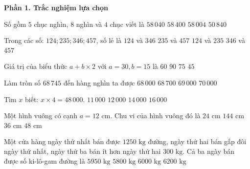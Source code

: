 \textbf{Phần 1. Trắc nghiệm lựa chọn}

\begin{ex} %
Số gồm $5$ chục nghìn, $8$ nghìn và $4$ chục viết là
\choice
{\True $58\,040$}
{$58\,400$}
{$58\,004$}
{$50\,840$}
\end{ex}

\begin{ex} %
Trong các số: $124; 235; 346; 457$, số lẻ là
\choice
{$124$ và $346$}
{\True $235$ và $457$}
{$124$ và $235$}
{$346$ và $457$}
\end{ex}

\begin{ex} %
Giá trị của biểu thức $a + b \times 2$ với $a = 30, b = 15$ là
\choice
{\True $60$}
{$90$}
{$75$}
{$45$}
\end{ex}

\begin{ex} %
Làm tròn số $68\,745$ đến hàng nghìn ta được
\choice
{$68\,000$}
{$68\,700$}
{\True $69\,000$}
{$70\,000$}
\end{ex}

\begin{ex} %
Tìm $x$ biết: $x \times 4 = 48\,000$.
\choice
{$11\,000$}
{\True $12\,000$}
{$14\,000$}
{$16\,000$}
\end{ex}

\begin{ex} %
Một hình vuông có cạnh $a = 12\text{ cm}$. Chu vi của hình vuông đó là
\choice
{$24\text{ cm}$}
{$144\text{ cm}$}
{$36\text{ cm}$}
{\True $48\text{ cm}$}
\end{ex}

\begin{ex} %
Một cửa hàng ngày thứ nhất bán được $1250\text{ kg}$ đường, ngày thứ hai bán gấp đôi ngày thứ nhất, ngày thứ ba bán ít hơn ngày thứ hai $300\text{ kg}$. Cả ba ngày bán được số ki-lô-gam đường là
\choice
{\True $5950\text{ kg}$}
{$5800\text{ kg}$}
{$6000\text{ kg}$}
{$6200\text{ kg}$}
\end{ex}

